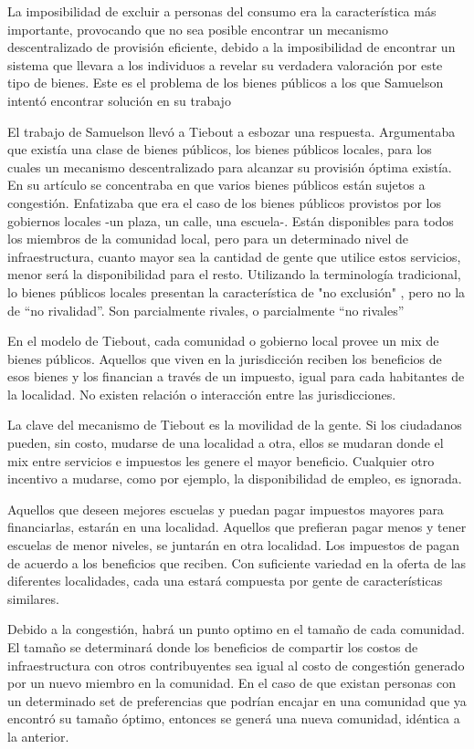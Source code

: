 \begin{enumerate}
La imposibilidad de excluir a personas del consumo era la característica más importante, provocando que no sea posible encontrar un mecanismo descentralizado de provisión eficiente, debido a la imposibilidad de encontrar un sistema que llevara a los individuos a revelar su verdadera valoración por este tipo de bienes. Este es el problema de los bienes públicos a los que Samuelson intentó encontrar solución en su trabajo \cite{Samuelson_1955}

El trabajo de Samuelson llevó a Tiebout a esbozar una respuesta. Argumentaba que existía una clase de bienes públicos, los bienes públicos locales, para los cuales un mecanismo descentralizado para alcanzar su provisión óptima existía. En su artículo se concentraba en que varios bienes públicos están sujetos a congestión. Enfatizaba que era el caso de los bienes públicos provistos por los gobiernos locales -un plaza, un calle, una escuela-. Están disponibles para todos los miembros de la comunidad local, pero para un determinado nivel de infraestructura, cuanto mayor sea la cantidad de gente que utilice estos servicios, menor será la disponibilidad para el resto. Utilizando la terminología tradicional, lo bienes públicos locales presentan la característica de "no exclusión" , pero no la de ``no rivalidad''. Son parcialmente rivales, o parcialmente ``no rivales''

En el modelo de Tiebout, cada comunidad o gobierno local provee un mix de bienes públicos. Aquellos que viven en la jurisdicción reciben los beneficios de esos bienes y los financian a través de un impuesto, igual para cada habitantes de la localidad. No existen relación o interacción entre las jurisdicciones.

La clave del mecanismo de Tiebout es la movilidad de la gente. Si los ciudadanos pueden, sin costo, mudarse de una localidad a otra, ellos se mudaran donde el mix entre servicios e impuestos les genere el mayor beneficio. Cualquier otro incentivo a mudarse, como por ejemplo, la disponibilidad de empleo, es ignorada.

Aquellos que deseen mejores escuelas y puedan pagar impuestos mayores para financiarlas, estarán en una localidad. Aquellos que prefieran pagar menos y tener escuelas de menor niveles, se juntarán en otra localidad. Los impuestos de pagan de acuerdo a los beneficios que reciben. Con suficiente variedad en la oferta de las diferentes localidades, cada una estará compuesta por gente de características similares.

Debido a la congestión, habrá un punto optimo en el tamaño de cada comunidad. El tamaño se determinará donde los beneficios de compartir los costos de infraestructura con otros contribuyentes sea igual al costo de congestión generado por un nuevo miembro en la comunidad. En el caso de que existan personas con un determinado set de preferencias que podrían encajar en una comunidad que ya encontró su tamaño óptimo, entonces se generá una nueva comunidad, idéntica a la anterior.


\end{enumerate}
